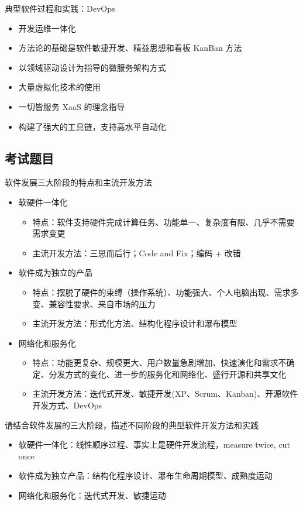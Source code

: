 典型软件过程和实践：DevOps
\vspace{-0.8em}
\begin{multicols}{2}
    \begin{itemize}
        \item 开发运维一体化
        \item 方法论的基础是软件敏捷开发、精益思想和看板 KanBan 方法
        \item 以领域驱动设计为指导的微服务架构方式
        \item 大量虚拟化技术的使用
        \item 一切皆服务 XaaS 的理念指导
        \item 构建了强大的工具链，支持高水平自动化
    \end{itemize}
\end{multicols}
\vspace{-1em}

\subsection{考试题目}
\begin{problem}
软件发展三大阶段的特点和主流开发方法
\begin{itemize}
    \item 软硬件一体化
    \begin{itemize}
        \item 特点：软件支持硬件完成计算任务、功能单一、复杂度有限、几乎不需要需求变更
        \item 主流开发方法：三思而后行；Code and Fix；编码 + 改错
    \end{itemize}
    \item 软件成为独立的产品
    \begin{itemize}
        \item 特点：摆脱了硬件的束缚（操作系统）、功能强大、个人电脑出现、需求多变、兼容性要求、来自市场的压力
        \item 主流开发方法：形式化方法、结构化程序设计和瀑布模型
    \end{itemize}
    \item 网络化和服务化
    \begin{itemize}
        \item 特点：功能更复杂、规模更大、用户数量急剧增加、快速演化和需求不确定、分发方式的变化、进一步的服务化和网络化、盛行开源和共享文化
        \item 主流开发方法：迭代式开发、敏捷开发(XP、Scrum、Kanban)、开源软件开发方式、DevOps
    \end{itemize}
\end{itemize}
\end{problem}

\begin{problem}
请结合软件发展的三大阶段，描述不同阶段的典型软件开发方法和实践
\begin{itemize}
    \item 软硬件一体化：线性顺序过程、事实上是硬件开发流程，measure twice, cut once
    \item 软件成为独立产品：结构化程序设计、瀑布生命周期模型、成熟度运动
    \item 网络化和服务化：迭代式开发、敏捷运动
\end{itemize}
\end{problem}




